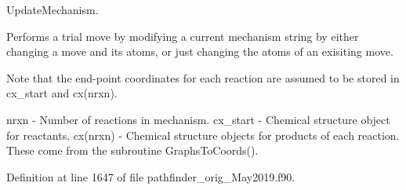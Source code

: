 Update\+Mechanism. 

Performs a trial move by modifying a current mechanism string by either changing a move and its atoms, or just changing the atoms of an exisiting move.

Note that the end-\/point coordinates for each reaction are assumed to be stored in cx\+\_\+start and cx(nrxn).

nrxn -\/ Number of reactions in mechanism. cx\+\_\+start -\/ Chemical structure object for reactants. cx(nrxn) -\/ Chemical structure objects for products of each reaction. These come from the subroutine Graphs\+To\+Coords(). 

Definition at line 1647 of file pathfinder\+\_\+orig\+\_\+\+May2019.\+f90.

